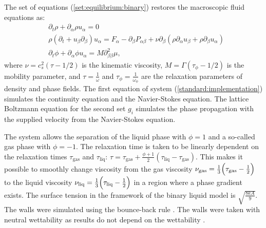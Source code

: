 \documentclass[preprint,12pt]{elsarticle}
\begin{document}
The set of equations (\ref{set:equilibrium:binary}) restores the macroscopic
fluid equations as:
\begin{equation}
\label{full:navier:stokes}
\begin{aligned}
&\partial_t \rho+ \partial_{\alpha} \rho u_{\alpha}=0\\
&\rho\left(\partial_t+u_{\beta}\partial_{\beta}\right) u_{\alpha}=F_{\alpha}
-\partial_{\beta}P_{\alpha \beta} +
\nu\partial_{\beta}\left(\rho\partial_{\alpha}u_{\beta}+\rho\partial_{\beta} u_{\alpha}\right)\\
&\partial_t \phi + \partial_{\alpha} \phi u_{\alpha}=M \partial^2_{\beta\beta} \mu,
\end{aligned}
\end{equation}
where $\nu=c_s^2 (\tau-1/2)$ is the kinematic viscosity,
$M=\Gamma(\tau_{\phi}-1/2)$ is the mobility parameter, and $\tau=\frac{1}{\omega}$ and
$\tau_{\phi}=\frac{1}{\omega_{\phi}}$
are the relaxation parameters of density and phase fields. The first equation of system
(\ref{standard:implementation}) simulates the continuity equation and the Navier-Stokes equation.
The lattice Boltzmann equation for the second set $g_i$ simulates the phase propagation with the
supplied velocity from the Navier-Stokes equation.

The system allows the separation of the liquid
phase with $\phi=1$ and a so-called gas phase with $\phi=-1$. The
relaxation time is taken to be linearly dependent on the relaxation
times $\tau_{\mathrm{gas}}$ and $\tau_{\mathrm{liq}}$:
$\tau=\tau_{\mathrm{gas}}+\frac{\phi+1}{2}(\tau_{\mathrm{liq}}-\tau_{\mathrm{gas}})$. This
makes it possible to smoothly change viscosity from the gas viscosity
$\nu_{\mathrm{gas}}=\frac{1}{3}\Bigl(\tau_{\mathrm{gas}}-\frac{1}{2}\Bigr)$ to the liquid viscosity
$\nu_{\mathrm{liq}}=\frac{1}{3}\Bigl(\tau_{\mathrm{liq}}-\frac{1}{2}\Bigr)$ in a region where a
phase gradient exists. The surface tension in the framework of the binary liquid model is $\sqrt{\frac{8 k
A}{9}}$. {\color{red} The walls were simulated using the bounce-back rule \cite{yu}. The walls were
taken with neutral wettability as results do not depend on the wettability \cite{kuzmin-binary2d}.}
\end{document}
